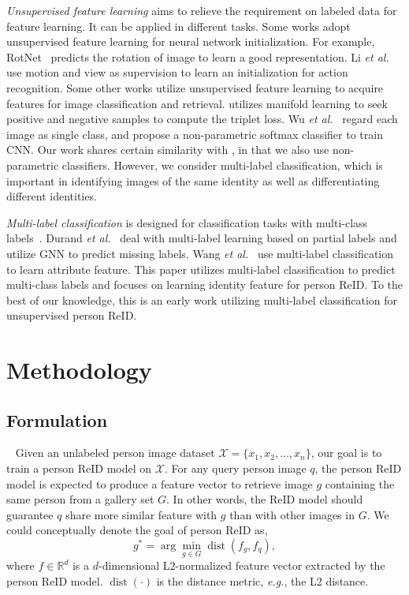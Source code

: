 \documentclass[10pt,twocolumn,letterpaper]{article}
\begin{document}
\emph{Unsupervised feature learning} aims to relieve the requirement on labeled data for feature learning. It can be applied in different tasks. Some works adopt unsupervised feature learning for neural network initialization. For example, RotNet~\cite{komodakis2018unsupervised} predicts the rotation of image to learn a good representation. Li \emph{et al.}~\cite{li2018unsupervised} use motion and view as supervision to learn an initialization for action recognition. Some other works utilize unsupervised feature learning to acquire features for image classification and retrieval. \cite{iscen2018mining} utilizes manifold learning to seek positive and negative samples to compute the triplet loss. Wu \emph{et al.}~\cite{wu2018unsupervised} regard each image as single class, and propose a non-parametric softmax classifier to train CNN. Our work shares certain similarity with \cite{wu2018unsupervised}, in that we also use non-parametric classifiers. However, we consider multi-label classification, which is important in identifying images of the same identity as well as differentiating different identities.

\emph{Multi-label classification} is designed for classification tasks with multi-class labels~\cite{zhang2013review,Durand_2019_CVPR,wang2018transferable,lin2018multi}. Durand \emph{et al.}~\cite{Durand_2019_CVPR} deal with multi-label learning based on partial labels and utilize GNN to predict missing labels. Wang \emph{et al.}~\cite{wang2018transferable,lin2018multi} use multi-label classification to learn attribute feature. This paper utilizes multi-label classification to predict multi-class labels and focuses on learning identity feature for person ReID. To the best of our knowledge, this is an early work utilizing multi-label classification for unsupervised person ReID.

\section{Methodology}
\subsection{Formulation} ~\label{sec:formulate}
Given an unlabeled person image dataset $\mathcal X=\{x_1,x_2,...,x_n\}$, our goal is to train a person ReID model on $\mathcal X$. For any query person image $q$, the person ReID model is expected to produce a feature vector to retrieve image $g$ containing the same person from a gallery set $G$. In other words, the ReID model should guarantee $q$ share more similar feature with $g$ than with other images in $G$. We could conceptually denote the goal of person ReID as,
\begin{equation}
g^* = \arg\min_{g\in G} \operatorname {dist}(f_g,f_q),
\end{equation}
where $f \in \mathbb{R}^d$ is a $d$-dimensional L2-normalized feature vector extracted by the person ReID model. $\operatorname {dist}(\cdot)$ is the distance metric, \emph{e.g.}, the L2 distance.
\end{document}
